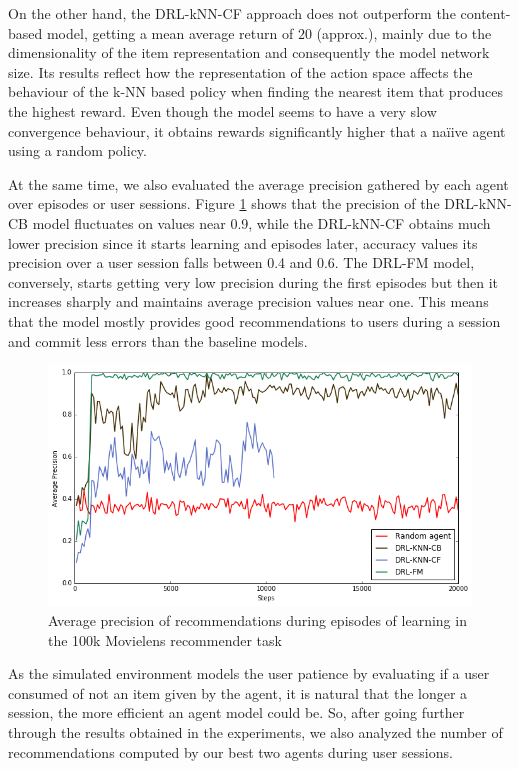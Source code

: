 On the other hand, the DRL-kNN-CF approach does not outperform the content-based model, getting a mean average return of $ 20$ (approx.), mainly due to the dimensionality of the item representation and consequently the model network size. Its results reflect how the representation of the action space affects the behaviour of the k-NN based policy when finding the nearest item that produces the highest reward. Even though the model seems to have a very slow convergence behaviour, it obtains rewards significantly higher that a na{\"i}ive agent using a random policy.

At the same time, we also evaluated the average precision gathered by each agent over episodes or user sessions. Figure \ref{fig:precision_train} shows that the precision of the DRL-kNN-CB model fluctuates on values near 0.9, while the DRL-kNN-CF obtains much lower precision since it starts learning and episodes later, accuracy values its precision over a user session falls between 0.4 and 0.6. The DRL-FM model, conversely, starts getting  very low precision during the first episodes but then it increases sharply and maintains average precision values near one. This means that the model mostly provides good recommendations to users during a session and commit less errors than the baseline models.

\begin{figure}[t]
\centering
\includegraphics[scale=0.5]{images/eval_precision_train}
\caption{Average precision of recommendations during episodes of learning in the 100k Movielens recommender task}
\label{fig:precision_train}
\end{figure}

As the simulated environment models the user patience by evaluating if a user consumed of not an item given by the agent, it is natural that the longer a session, the more efficient an agent model could be. So, after going further through the results obtained in the experiments, we also analyzed the number of recommendations computed by our best two agents during user sessions. 

